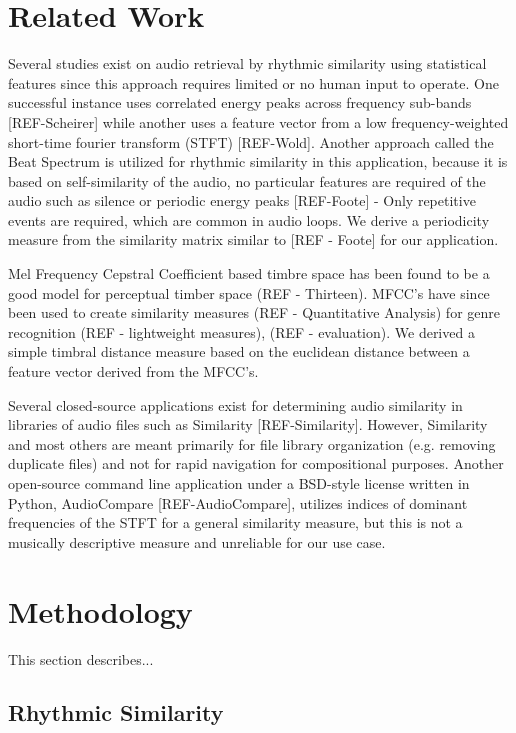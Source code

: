 \documentclass{article}
\begin{document}
\section{Related Work}

Several studies exist on audio retrieval by rhythmic similarity using statistical features since this approach requires limited or no human input to operate. One successful instance uses correlated energy peaks across frequency sub-bands [REF-Scheirer]  while another uses a feature vector from a low frequency-weighted short-time fourier transform (STFT) [REF-Wold]. Another approach called the Beat Spectrum is utilized for rhythmic similarity in this application, because it is based on self-similarity of the audio, no particular features are required of the audio such as silence or periodic energy peaks [REF-Foote] - Only repetitive events are required, which are common in audio loops. We derive a periodicity measure from the similarity matrix similar to [REF - Foote] for our application.

Mel Frequency Cepstral Coefficient based timbre space has been found to be a good model for perceptual timber space (REF - Thirteen). MFCC’s have since been used to create similarity measures (REF - Quantitative Analysis) for genre recognition (REF -  lightweight measures), (REF - evaluation). We derived a simple timbral distance measure based on the euclidean distance between a feature vector derived from the MFCC's.

Several closed-source applications exist for determining audio similarity in libraries of audio files such as Similarity [REF-Similarity]. However, Similarity and most others are meant primarily for file library organization (e.g. removing duplicate files) and not for rapid navigation for compositional purposes. Another open-source command line application under a BSD-style license written in Python, AudioCompare [REF-AudioCompare], utilizes indices of dominant frequencies of the STFT for a general similarity measure, but this is not a musically descriptive measure and unreliable for our use case. 


\section{Methodology}
This section describes...

\subsection{Rhythmic Similarity}
\end{document}
